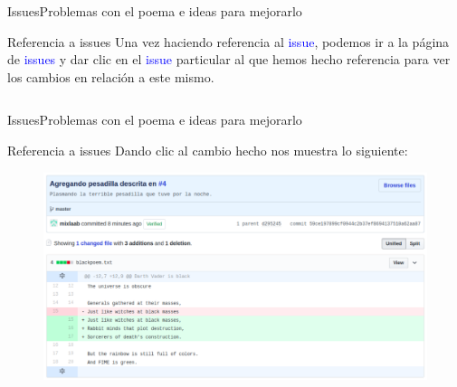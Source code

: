 \documentclass[10pt]{beamer}
\begin{document}
\begin{frame}{Issues}{Problemas con el poema e ideas para mejorarlo}

\begin{block}{Referencia a issues}
Una vez haciendo referencia al \textcolor{blue}{issue}, podemos ir a la página de \textcolor{blue}{issues} y dar clic en el \textcolor{blue}{issue} particular al que hemos hecho referencia para ver los cambios en relación a este mismo.

\begin{columns}[c]
\column{1.7in}

\column{1.7in}

\end{columns}
    
\end{block}

\end{frame}

\begin{frame}{Issues}{Problemas con el poema e ideas para mejorarlo}

\begin{block}{Referencia a issues}
Dando clic al cambio hecho nos muestra lo siguiente:
\vspace{-0.1in}
\begin{figure}[h!]
\centering
\includegraphics [scale=0.35]{changesissue}
\label{fig:first}
\end{figure}
    
\end{block}

\end{frame}
\end{document}
